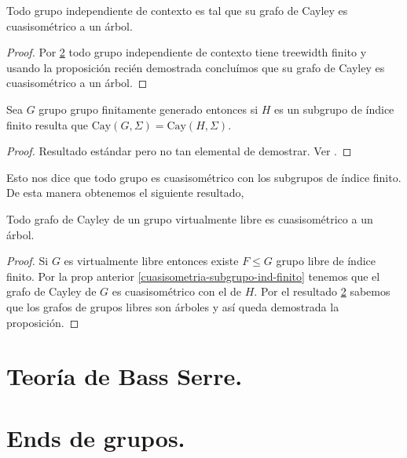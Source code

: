 \documentclass[tesis.tex]{subfiles}
\newcommand{\fg}{grupo finitamente generado }
\begin{document}
\begin{coro}
	Todo grupo independiente de contexto es tal que su grafo de Cayley es cuasisométrico a un árbol.
\end{coro}
\begin{proof}
	Por \ref{} todo grupo independiente de contexto tiene treewidth finito y usando la proposición recién demostrada concluímos que su grafo de Cayley es cuasisométrico a un árbol.
\end{proof}
\medskip

\begin{prop}\label{cuasisometria-subgrupo-ind-finito}
	Sea $G$ grupo \fg entonces si $H$ es un subgrupo de índice finito resulta que $\text{Cay}(G,\Sigma) = \text{Cay}(H, \Sigma)$.
\end{prop}
\begin{proof}
	Resultado estándar pero no tan elemental de demostrar. Ver \cite{loh2017geometric}.
\end{proof}

Esto nos dice que todo grupo es cuasisométrico con los subgrupos de índice finito. 
De esta manera obtenemos el siguiente resultado,

\begin{prop}
	Todo grafo de Cayley de un grupo virtualmente libre es cuasisométrico a un árbol.
\end{prop}

\begin{proof}
	Si $G$ es virtualmente libre entonces existe $F \le G$ grupo libre de índice finito.
	Por la prop anterior \ref{cuasisometria-subgrupo-ind-finito} tenemos que el grafo de Cayley de $G$ es cuasisométrico con el de $H$.
	Por el resultado \ref{} sabemos que los grafos de grupos libres son árboles y así queda demostrada la proposición.
\end{proof}

\section{Teoría de Bass Serre.}

\section{Ends de grupos.}
	
	
	
\end{document}
